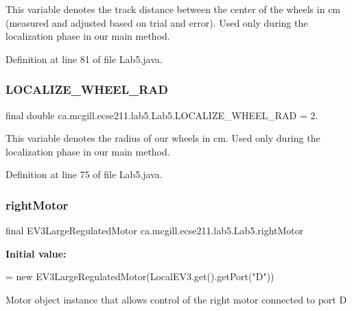 This variable denotes the track distance between the center of the wheels in cm (measured and adjusted based on trial and error). Used only during the localization phase in our main method. 

Definition at line 81 of file Lab5.\+java.

\mbox{\label{classca_1_1mcgill_1_1ecse211_1_1lab5_1_1_lab5_a6bc8fbcc688c767a11226cb7b5da3411}} 
\subsubsection{\texorpdfstring{L\+O\+C\+A\+L\+I\+Z\+E\+\_\+\+W\+H\+E\+E\+L\+\_\+\+R\+AD}{LOCALIZE\_WHEEL\_RAD}}
{\footnotesize\ttfamily final double ca.\+mcgill.\+ecse211.\+lab5.\+Lab5.\+L\+O\+C\+A\+L\+I\+Z\+E\+\_\+\+W\+H\+E\+E\+L\+\_\+\+R\+AD = 2.\hspace{0.3cm}{\ttfamily [static]}}

This variable denotes the radius of our wheels in cm. Used only during the localization phase in our main method. 

Definition at line 75 of file Lab5.\+java.

\mbox{\label{classca_1_1mcgill_1_1ecse211_1_1lab5_1_1_lab5_a70575e1c6e84cd9d22cadd141ad6ceae}} 
\subsubsection{\texorpdfstring{right\+Motor}{rightMotor}}
{\footnotesize\ttfamily final E\+V3\+Large\+Regulated\+Motor ca.\+mcgill.\+ecse211.\+lab5.\+Lab5.\+right\+Motor\hspace{0.3cm}{\ttfamily [static]}}

{\bfseries Initial value\+:}
\begin{DoxyCode}
=
      \textcolor{keyword}{new} EV3LargeRegulatedMotor(LocalEV3.get().getPort(\textcolor{stringliteral}{"D"}))
\end{DoxyCode}
Motor object instance that allows control of the right motor connected to port D 


